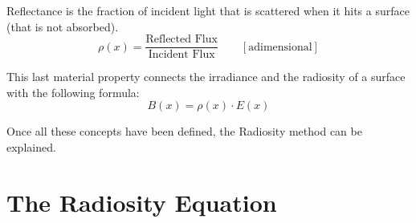 \begin{definicion}[Reflectance]
    Reflectance is the fraction of incident light that is scattered when it hits a surface (that is not absorbed).
    \begin{equation*}
        \rho(x) = \frac{\text{Reflected Flux}}{\text{Incident Flux}} \qquad [\text{adimensional}]
    \end{equation*}
\end{definicion}

This last material property connects the irradiance and the radiosity of a surface with the following formula:
\begin{equation}\label{eq:radiosity_irradiance}
    B(x) = \rho(x) \cdot E(x)
\end{equation}

Once all these concepts have been defined, the Radiosity method can be explained.

\section{The Radiosity Equation}

